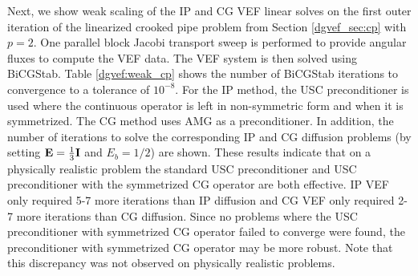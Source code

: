 \documentclass[../doc.tex]{subfiles}
\begin{document}
Next, we show weak scaling of the IP and CG VEF linear solves on the first outer iteration of the linearized crooked pipe problem from Section \ref{dgvef_sec:cp} with $p=2$. One parallel block Jacobi transport sweep is performed to provide angular fluxes to compute the VEF data. The VEF system is then solved using BiCGStab. Table \ref{dgvef:weak_cp} shows the number of BiCGStab iterations to convergence to a tolerance of $10^{-8}$. For the IP method, the USC preconditioner is used where the continuous operator is left in non-symmetric form and when it is symmetrized. The CG method uses AMG as a preconditioner. In addition, the number of iterations to solve the corresponding IP and CG diffusion problems (by setting $\boldsymbol{\mathrm{E}} = \frac{1}{3}\boldsymbol{\mathrm{I}}$ and $E_b = 1/2$) are shown. These results indicate that on a physically realistic problem the standard USC preconditioner and USC preconditioner with the symmetrized CG operator are both effective. IP VEF only required 5-7 more iterations than IP diffusion and CG VEF only required 2-7 more iterations than CG diffusion. Since no problems where the USC preconditioner with symmetrized CG operator failed to converge were found, the preconditioner with symmetrized CG operator may be more robust. Note that this discrepancy was not observed on physically realistic problems. 
\begin{table}
\centering
\caption{}
\label{dgvef:weak_cp}

\end{table}
\end{document}
